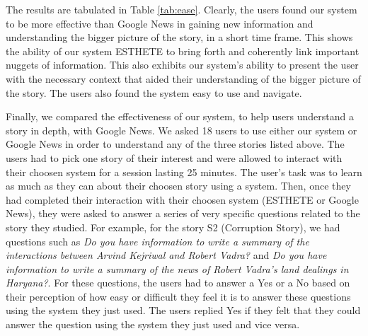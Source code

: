 The results are tabulated in Table \ref{tab:ease}.
Clearly, the users found our system to be more effective than Google News in gaining new information and understanding the bigger picture of the story, in a short time frame. This shows the ability of our system ESTHETE to bring forth and coherently link important nuggets of information. This also exhibits our system's ability to present the user with the necessary context that aided their understanding of the bigger picture of the story. The users also found the system easy to use and navigate.


Finally, we compared the effectiveness of our system, to help users understand a story in depth, with Google News. We asked 18 users to use either our system or Google News in order to understand any of the three stories listed above. The users had to pick one story of their interest and were allowed to interact with their choosen system for a session lasting 25 minutes. The user's task was to learn as much as they can about their choosen story using a system. Then, once they had completed their interaction with their choosen system (ESTHETE or Google News), they were asked to answer a series of very specific questions related to the story they studied. For example, for the story S2 (Corruption Story), we had questions such as \emph{Do you have information to write a summary of the interactions between Arvind Kejriwal and Robert Vadra?} and \emph{Do you have information to write a summary of the news of Robert Vadra's land dealings in Haryana?}. For these questions, the users had to answer a Yes or a No based on their perception of how easy or difficult they feel it is to answer these questions using the system they just used. The users replied Yes if they felt that they could answer the question using the system they just used and vice versa.

